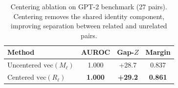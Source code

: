 
\begin{table}[t]
\centering
\small
\begin{tabular}{@{}lccc@{}}
\toprule
Method & AUROC & Gap-$Z$ & Margin \\
\midrule
Uncentered $\mathrm{vec}(M_\ell)$ & 1.000 & +28.7 & 0.837 \\
Centered $\mathrm{vec}(R_\ell)$ & \textbf{1.000} & \textbf{+29.2} & \textbf{0.861} \\
\bottomrule
\end{tabular}
\caption{Centering ablation on GPT-2 benchmark (27 pairs). Centering removes the shared identity component, improving separation between related and unrelated pairs.}
\label{tab:centering-ablation}
\end{table}
